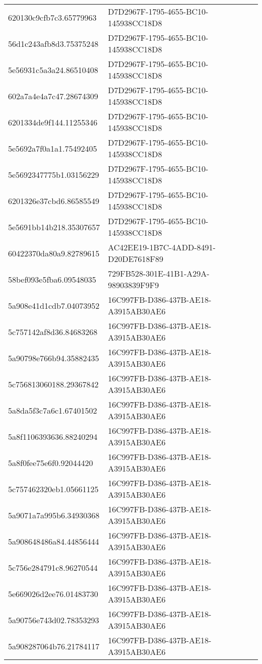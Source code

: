 \begin{tabular}{ll}
620130c9cfb7c3.65779963 & D7D2967F-1795-4655-BC10-145938CC18D8 \\
56d1c243afb8d3.75375248 & D7D2967F-1795-4655-BC10-145938CC18D8 \\
5e56931c5a3a24.86510408 & D7D2967F-1795-4655-BC10-145938CC18D8 \\
602a7a4e4a7c47.28674309 & D7D2967F-1795-4655-BC10-145938CC18D8 \\
6201334de9f144.11255346 & D7D2967F-1795-4655-BC10-145938CC18D8 \\
5e5692a7f0a1a1.75492405 & D7D2967F-1795-4655-BC10-145938CC18D8 \\
5e5692347775b1.03156229 & D7D2967F-1795-4655-BC10-145938CC18D8 \\
6201326e37cbd6.86585549 & D7D2967F-1795-4655-BC10-145938CC18D8 \\
5e5691bb14b218.35307657 & D7D2967F-1795-4655-BC10-145938CC18D8 \\
60422370da80a9.82789615 & AC42EE19-1B7C-4ADD-8491-D20DE7618F89 \\
58bef093e5fba6.09548035 & 729FB528-301E-41B1-A29A-98903839F9F9 \\
5a908e41d1cdb7.04073952 & 16C997FB-D386-437B-AE18-A3915AB30AE6 \\
5c757142af8d36.84683268 & 16C997FB-D386-437B-AE18-A3915AB30AE6 \\
5a90798e766b94.35882435 & 16C997FB-D386-437B-AE18-A3915AB30AE6 \\
5c756813060188.29367842 & 16C997FB-D386-437B-AE18-A3915AB30AE6 \\
5a8da5f3c7a6c1.67401502 & 16C997FB-D386-437B-AE18-A3915AB30AE6 \\
5a8f1106393636.88240294 & 16C997FB-D386-437B-AE18-A3915AB30AE6 \\
5a8f0fee75e6f0.92044420 & 16C997FB-D386-437B-AE18-A3915AB30AE6 \\
5c757462320eb1.05661125 & 16C997FB-D386-437B-AE18-A3915AB30AE6 \\
5a9071a7a995b6.34930368 & 16C997FB-D386-437B-AE18-A3915AB30AE6 \\
5a908648486a84.44856444 & 16C997FB-D386-437B-AE18-A3915AB30AE6 \\
5c756e284791c8.96270544 & 16C997FB-D386-437B-AE18-A3915AB30AE6 \\
5e669026d2ee76.01483730 & 16C997FB-D386-437B-AE18-A3915AB30AE6 \\
5a90756e743d02.78353293 & 16C997FB-D386-437B-AE18-A3915AB30AE6 \\
5a908287064b76.21784117 & 16C997FB-D386-437B-AE18-A3915AB30AE6 \\

\end{tabular}
